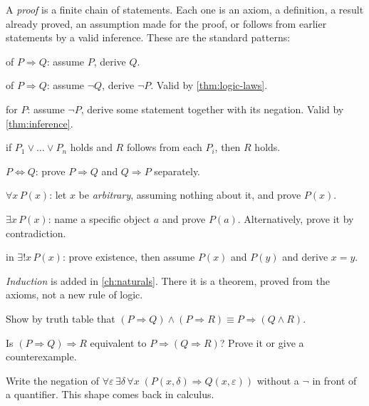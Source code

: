 A \emph{proof} is a finite chain of statements. Each one is an axiom, a
definition, a result already proved, an assumption made for the proof, or follows
from earlier statements by a valid inference. These are the standard patterns:

\begin{description}[style=nextline]
  \item[Direct proof] of $P \Rightarrow Q$: assume $P$, derive $Q$.
  \item[Contrapositive] of $P \Rightarrow Q$: assume $\lnot Q$, derive $\lnot P$.
    Valid by \cref{thm:logic-laws}.
  \item[Contradiction] for $P$: assume $\lnot P$, derive some statement together
    with its negation. Valid by \cref{thm:inference}.
  \item[Cases:] if $P_1 \lor \dots \lor P_n$ holds and $R$ follows from each
    $P_i$, then $R$ holds.
  \item[Equivalence] $P \Leftrightarrow Q$: prove $P \Rightarrow Q$ and $Q
    \Rightarrow P$ separately.
  \item[Universal statement] $\forall x\, P(x)$: let $x$ be \emph{arbitrary},
    assuming nothing about it, and prove $P(x)$.
  \item[Existence] $\exists x\, P(x)$: name a specific object $a$ and prove
    $P(a)$. Alternatively, prove it by contradiction.
  \item[Uniqueness] in $\exists! x\, P(x)$: prove existence, then assume $P(x)$ and
    $P(y)$ and derive $x = y$.
\end{description}

\emph{Induction} is added in \cref{ch:naturals}. There it is a theorem, proved
from the axioms, not a new rule of logic.

\begin{exercises}
  \item Show by truth table that $(P \Rightarrow Q) \land (P \Rightarrow R) \equiv
    P \Rightarrow (Q \land R)$.
  \item Is $(P \Rightarrow Q) \Rightarrow R$ equivalent to $P \Rightarrow (Q
    \Rightarrow R)$? Prove it or give a counterexample.
  \item Write the negation of $\forall \varepsilon\, \exists \delta\, \forall x\;
    (P(x, \delta) \Rightarrow Q(x, \varepsilon))$ without a $\lnot$ in front of a
    quantifier. This shape comes back in calculus.
\end{exercises}
